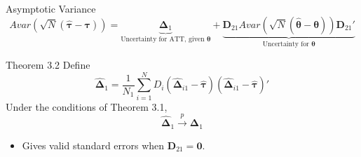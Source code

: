 \documentclass{beamer}
\newcommand{\1}{\mathds{1}} %
\newcommand{\plim}{\stackrel{p}{\rightarrow}} %
\newcommand{\isum}{\sum_{i = 1}^N}
\begin{document}

\begin{frame}{Asymptotic Variance}
    \begin{equation*}
        Avar(\sqrt{N}(\widehat{\bm \tau} - \bm \tau)) = \underbrace{\bm \Delta_1}_\text{Uncertainty for ATT, given $\bm \theta$} + \underbrace{\bm D_{21} Avar(\sqrt{N}(\widehat{\bm \theta} - \bm \theta)) \bm D_{21}'}_\text{Uncertainty for $\bm \theta$}
    \end{equation*}

    \begin{block}{Theorem 3.2}
        Define 
        \begin{equation}
            \widehat{\bm \Delta}_1 = \frac{1}{N_1} \isum D_i \left( \widehat{\bm \Delta}_{i1} - \widehat{\bm \tau} \right) \left( \widehat{\bm \Delta}_{i1} - \widehat{\bm \tau} \right)'
        \end{equation}
        Under the conditions of Theorem 3.1, 
        \begin{equation}
            \widehat{\bm \Delta}_1 \plim \bm \Delta_1
        \end{equation}
    \end{block}
    \begin{itemize}
        \item Gives valid standard errors when $\bm D_{21} = \bm 0$. 
    \end{itemize}
\end{frame}



\end{document}
